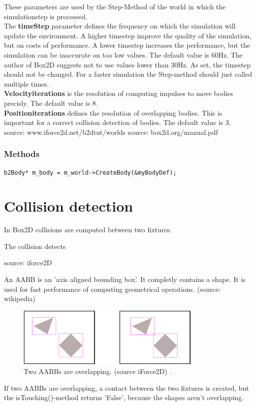 \documentclass[10pt,a4paper,DIV=11]{scrreprt}
\begin{document}
These parameters are used by the Step-Method of the world in which the simulationstep is processed. \\

The \textbf{timeStep} parameter defines the frequency on which the simulation will update the environment. A higher timestep improve the quality of the simulation, but on costs of performance. A lower timestep increases the performance, but the simulation can be inaccurate on too low values.
The default value is 60Hz. The author of Box2D suggests not to use values lower than 30Hz. As set, the timestep should not be changed. For a faster simulation the Step-method should just called multiple times. \\


\textbf{Velocityiterations} is the resolution of computing impulses to move bodies precisly. The default value is 8. \\

\textbf{Positioniterations} defines the resolution of overlapping bodies. This is important for a correct collision detection of bodies. The default value is 3. \\


source: www.iforce2d.net/b2dtut/worlds
source: box2d.org/manual.pdf

\subsubsection*{Methods}
\begin{lstlisting}[caption={World creates a body},label=lst:world-body]
b2Body* m_body = m_world->CreateBody(&myBodyDef);
\end{lstlisting}

\section{Collision detection}
In Box2D collisions are computed between two fixtures.

The collision detects

source: iforce2D


An AABB is an 'axis aligned bounding box'. It completly contains a shape. It is used for fast performance of computing geometrical operations. (source: wikipedia)

\begin{center}
	\begin{figure}[H]
		\centering
		\includegraphics[width=0.8\textwidth,scale=1.0]{files/aabbs-crossing.png}  
		\caption{Two AABBs are overlapping. (source iForce2D) \cite{box2d-iforce}.}
		\label{fig:aabbs}
	\end{figure}
\end{center}
If two AABBs are overlapping, a contact between the two fixtures is created, but the isTouching()-method returns 'False', because the shapes aren't overlapping.
\end{document}
